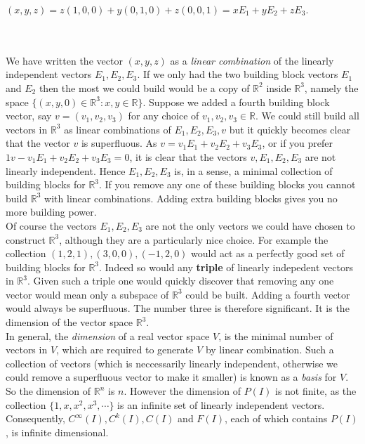 \documentclass{amsart}
\begin{document}
\centerline{$(x,y,z)=z(1,0,0)+y(0,1,0)+z(0,0,1)=xE_1+yE_2+zE_3$.}\\\\
We have written the vector $(x,y,z)$ as a {\it linear combination} of the linearly independent vectors $E_1,E_2, E_3$.  If we only had the two building block vectors $E_1$ and $E_2$ then the most we could build would be a copy of $\mathbb{R}^{2}$ inside $\mathbb{R}^{3}$, namely the space $\{(x,y,0)\in\mathbb{R}^{3}:x,y\in\mathbb{R}\}$. Suppose we added a fourth building block vector, say $v=(v_1,v_2,v_3)$ for any choice of $v_1,v_2,v_3\in\mathbb{R}$. We could still build all vectors in $\mathbb{R}^{3}$ as linear combinations of $E_1,E_2,E_3,v$ but it quickly becomes clear that the vector $v$ is superfluous. As $v=v_1E_1+v_2E_2+v_3E_3$, or if you prefer $1v-v_1E_1+v_2E_2+v_3E_3=0$, it is clear that the vectors $v, E_1,E_2,E_3$ are not linearly independent. Hence $E_1,E_2,E_3$ is, in a sense, a minimal collection of building blocks for $\mathbb{R}^{3}$. If you remove any one of these building blocks you cannot build $\mathbb{R}^{3}$ with linear combinations. Adding extra building blocks gives you no more building power.\\
Of course the vectors $E_1,E_2,E_3$ are not the only vectors we could have chosen to construct $\mathbb{R}^{3}$, although they are a particularly nice choice. For example the collection $(1,2,1),(3,0,0),(-1,2,0)$ would act as a perfectly good set of building blocks for $\mathbb{R}^{3}$. Indeed so would any {\bf triple} of linearly indepedent vectors in $\mathbb{R}^{3}$. Given such a triple one would quickly discover that removing any one vector would mean only a subspace of $\mathbb{R}^{3}$ could be built. Adding a fourth vector would always be superfluous. The number three is therefore significant. It is the dimension of the vector space $\mathbb{R}^{3}$.\\
In general, the {\it dimension} of a real vector space $V$, is the minimal number of vectors in $V$, which are required to generate $V$ by linear combination. Such a collection of vectors (which is neccessarily linearly independent, otherwise we could remove a superfluous vector to make it smaller) is known as a {\it basis} for $V$. So the dimension of $\mathbb{R}^{n}$ is $n$. However the dimension of $P(I)$ is not finite, as the collection $\{1,x,x^{2},x^{3},\cdots\}$ is an infinite set of linearly independent vectors. Consequently, $C^{\infty}(I), C^{k}(I), C(I)$ and  $F(I)$, each of which contains $P(I)$, is infinite dimensional.\\\\
\end{document}
